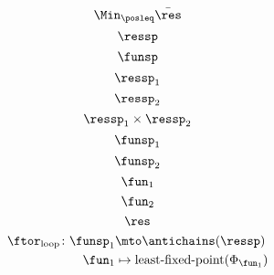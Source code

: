 {\begin{forslides}
        \begin{equation*}
            \label{eq:opt_6}
            \Min_{\posleq}\bar{\res}
        \end{equation*}
        \begin{equation*}
            \label{eq:genfun_1}
            \ressp
        \end{equation*}
        \begin{equation*}
            \label{eq:genfun_2}
            \funsp
        \end{equation*}
        \begin{equation*}
            \label{eq:genfun_3}
            \ressp_1
        \end{equation*}
        \begin{equation*}
            \label{eq:genfun_3_1}
            \ressp_2
        \end{equation*}
        \begin{equation*}
            \label{eq:genfun_3_2}
            \ressp_1\times \ressp_2
        \end{equation*}
        \begin{equation*}
            \label{eq:genfun_4}
            \funsp_1
        \end{equation*}
        \begin{equation*}
            \label{eq:genfun_5}
            \funsp_2
        \end{equation*}
        \begin{equation*}
            \label{eq:genfun_6}
            \fun_1
        \end{equation*}
        \begin{equation*}
            \label{eq:genfun_7}
            \fun_2
        \end{equation*}
        \begin{equation*}
            \label{eq:genfun_8}
            \res
        \end{equation*}
        \begin{equation*}
            \label{eq:genfun_9}
            \begin{aligned}
                \ftor_\mathrm{loop}\colon \funsp_1 &\mto \antichains(\ressp)\\
                \fun_1&\mapsto \text{least-fixed-point}(\Phi_{\fun_1})
            \end{aligned}
        \end{equation*}
        \begin{equation*}
            \label{eq:genfun_10}

\end{equation*}
\end{forslides}}
